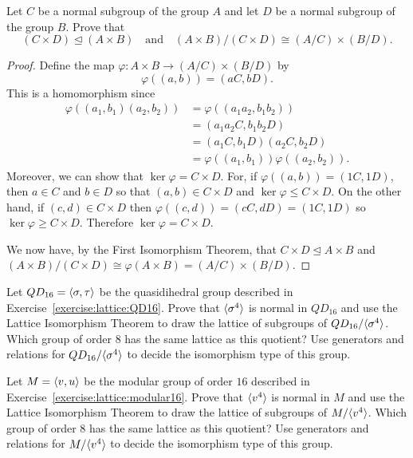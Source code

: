  Let $C$ be a normal subgroup of the group $A$ and let $D$
be a normal subgroup of the group $B$. Prove that
\begin{equation*}
  (C\times D)\trianglelefteq(A\times B)
  \quad\text{and}\quad
  (A\times B)/(C\times D)\cong(A/C)\times(B/D).
\end{equation*}
\begin{proof}
  Define the map $\varphi\colon A\times B\to(A/C)\times(B/D)$ by
  \begin{equation*}
    \varphi((a,b)) = (aC,bD).
  \end{equation*}
  This is a homomorphism since
  \begin{align*}
    \varphi((a_1,b_1)(a_2,b_2))
    &= \varphi((a_1a_2,b_1b_2)) \\
    &= (a_1a_2C, b_1b_2D) \\
    &= (a_1C,b_1D)(a_2C,b_2D) \\
    &= \varphi((a_1,b_1))\varphi((a_2,b_2)).
  \end{align*}
  Moreover, we can show that $\ker\varphi = C\times D$. For, if
  $\varphi((a,b)) = (1C,1D)$, then $a\in C$ and $b\in D$ so that
  $(a,b)\in C\times D$ and $\ker\varphi\leq C\times D$. On the other
  hand, if $(c,d)\in C\times D$ then
  $\varphi((c,d)) = (cC, dD) = (1C,1D)$ so
  $\ker\varphi\geq C\times D$. Therefore $\ker\varphi = C\times D$.

  We now have, by the First Isomorphism Theorem, that
  $C\times D\trianglelefteq A\times B$ and
  $(A\times B)/(C\times D)\cong \varphi(A\times B) =
  (A/C)\times(B/D)$.
\end{proof}

 Let $QD_{16} = \langle{\sigma,\tau}\rangle$ be the quasidihedral
group described in Exercise~\ref{exercise:lattice:QD16}. Prove that
$\langle{\sigma^4}\rangle$ is normal in $QD_{16}$ and use the Lattice
Isomorphism Theorem to draw the lattice of subgroups of
$QD_{16}/\langle{\sigma^4}\rangle$. Which group of order $8$ has the same
lattice as this quotient? Use generators and relations for
$QD_{16}/\langle{\sigma^4}\rangle$ to decide the isomorphism type of this group.

 Let $M = \langle{v,u}\rangle$ be the modular group of order $16$
described in Exercise~\ref{exercise:lattice:modular16}. Prove that
$\langle{v^4}\rangle$ is normal in $M$ and use the Lattice Isomorphism Theorem
to draw the lattice of subgroups of $M/\langle{v^4}\rangle$. Which group of
order $8$ has the same lattice as this quotient? Use generators and
relations for $M/\langle{v^4}\rangle$ to decide the isomorphism type of this
group.
